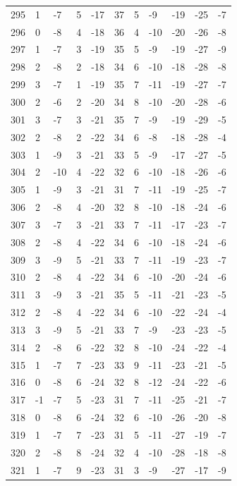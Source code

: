 \begin{table}[H]
\begin{tabular}{lllllllllll}
295 & 1 & -7 & 5 & -17 & 37 & 5 & -9 & -19 & -25 & -7 \\
296 & 0 & -8 & 4 & -18 & 36 & 4 & -10 & -20 & -26 & -8 \\
297 & 1 & -7 & 3 & -19 & 35 & 5 & -9 & -19 & -27 & -9 \\
298 & 2 & -8 & 2 & -18 & 34 & 6 & -10 & -18 & -28 & -8 \\
299 & 3 & -7 & 1 & -19 & 35 & 7 & -11 & -19 & -27 & -7 \\
300 & 2 & -6 & 2 & -20 & 34 & 8 & -10 & -20 & -28 & -6 \\
301 & 3 & -7 & 3 & -21 & 35 & 7 & -9 & -19 & -29 & -5 \\
302 & 2 & -8 & 2 & -22 & 34 & 6 & -8 & -18 & -28 & -4 \\
303 & 1 & -9 & 3 & -21 & 33 & 5 & -9 & -17 & -27 & -5 \\
304 & 2 & -10 & 4 & -22 & 32 & 6 & -10 & -18 & -26 & -6 \\
305 & 1 & -9 & 3 & -21 & 31 & 7 & -11 & -19 & -25 & -7 \\
306 & 2 & -8 & 4 & -20 & 32 & 8 & -10 & -18 & -24 & -6 \\
307 & 3 & -7 & 3 & -21 & 33 & 7 & -11 & -17 & -23 & -7 \\
308 & 2 & -8 & 4 & -22 & 34 & 6 & -10 & -18 & -24 & -6 \\
309 & 3 & -9 & 5 & -21 & 33 & 7 & -11 & -19 & -23 & -7 \\
310 & 2 & -8 & 4 & -22 & 34 & 6 & -10 & -20 & -24 & -6 \\
311 & 3 & -9 & 3 & -21 & 35 & 5 & -11 & -21 & -23 & -5 \\
312 & 2 & -8 & 4 & -22 & 34 & 6 & -10 & -22 & -24 & -4 \\
313 & 3 & -9 & 5 & -21 & 33 & 7 & -9 & -23 & -23 & -5 \\
314 & 2 & -8 & 6 & -22 & 32 & 8 & -10 & -24 & -22 & -4 \\
315 & 1 & -7 & 7 & -23 & 33 & 9 & -11 & -23 & -21 & -5 \\
316 & 0 & -8 & 6 & -24 & 32 & 8 & -12 & -24 & -22 & -6 \\
317 & -1 & -7 & 5 & -23 & 31 & 7 & -11 & -25 & -21 & -7 \\
318 & 0 & -8 & 6 & -24 & 32 & 6 & -10 & -26 & -20 & -8 \\
319 & 1 & -7 & 7 & -23 & 31 & 5 & -11 & -27 & -19 & -7 \\
320 & 2 & -8 & 8 & -24 & 32 & 4 & -10 & -28 & -18 & -8 \\
321 & 1 & -7 & 9 & -23 & 31 & 3 & -9 & -27 & -17 & -9 \\

\end{tabular}
\end{table}
